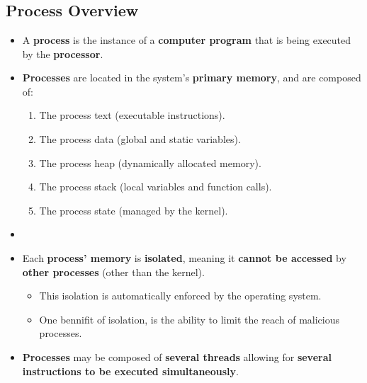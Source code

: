 \documentclass{article}
\begin{document}
    \section*{}

    \subsection*{Process Overview}
    \begin{itemize}
        \item A \textbf{process} is the instance of a \textbf{computer program} that is being executed by the \textbf{processor}.
        \item \textbf{Processes} are located in the system's \textbf{primary memory}, and are composed of:
        \begin{enumerate}
            \item The process text (executable instructions).
            \item The process data (global and static variables).
            \item The process heap (dynamically allocated memory).
            \item The process stack (local variables and function calls).
            \item The process state (managed by the kernel).
        \end{enumerate}
        \item[]  
        \item \raggedright Each \textbf{process' memory} is \textbf{isolated}, meaning it \textbf{cannot be accessed} by \textbf{other processes} (other than the kernel).
        \begin{itemize}
            \item This isolation is automatically enforced by the operating system.
            \item One bennifit of isolation, is the ability to limit the reach of malicious processes.
        \end{itemize}
        \item \textbf{Processes} may be composed of \textbf{several threads} allowing for \textbf{several instructions to be executed simultaneously}.
    \end{itemize}
\end{document}
